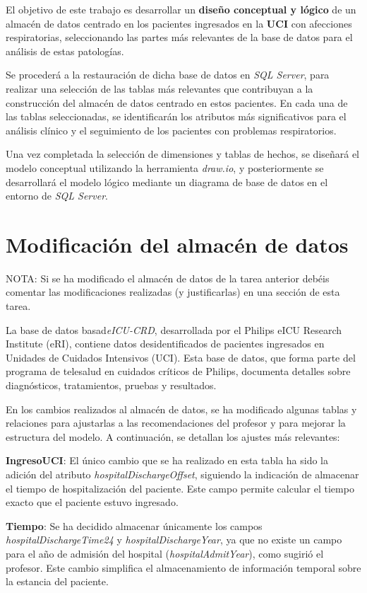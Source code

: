 \documentclass[12pt, a4paper, twoside]{article}
\begin{document}
	El objetivo de este trabajo es desarrollar un \textbf{diseño conceptual y lógico} de un almacén de datos centrado en los pacientes ingresados en la \textbf{UCI} con afecciones respiratorias, seleccionando las partes más relevantes de la base de datos para el análisis de estas patologías.
	
	Se procederá a la restauración de dicha base de datos en \textit{SQL Server}, para realizar una selección de las tablas más relevantes que contribuyan a la construcción del almacén de datos centrado en estos pacientes. En cada una de las tablas seleccionadas, se identificarán los atributos más significativos para el análisis clínico y el seguimiento de los pacientes con problemas respiratorios. 
	
	Una vez completada la selección de dimensiones y tablas de hechos, se diseñará el modelo conceptual utilizando la herramienta \textit{draw.io}, y posteriormente se desarrollará el modelo lógico mediante un diagrama de base de datos en el entorno de \textit{SQL Server}. 
	
	\section{Modificación del almacén de datos}
	
	NOTA: Si se ha modificado el almacén de datos de la tarea anterior debéis comentar las modificaciones realizadas (y justificarlas) en una sección de esta tarea. 
	
	 La base de datos basad\textit{eICU-CRD}, desarrollada por el Philips eICU Research Institute (eRI), contiene datos desidentificados de pacientes ingresados en Unidades de Cuidados Intensivos (UCI). Esta base de datos, que forma parte del programa de telesalud en cuidados críticos de Philips, documenta detalles sobre diagnósticos, tratamientos, pruebas y resultados.
	
	En los cambios realizados al almacén de datos, se ha modificado algunas tablas y relaciones para ajustarlas a las recomendaciones del profesor y para mejorar la estructura del modelo. A continuación, se detallan los ajustes más relevantes:
	
	\textbf{IngresoUCI}: El único cambio que se ha realizado en esta tabla ha sido la adición del atributo \textit{hospitalDischargeOffset}, siguiendo la indicación de almacenar el tiempo de hospitalización del paciente. Este campo permite calcular el tiempo exacto que el paciente estuvo ingresado.
	
	\textbf{Tiempo}: Se ha decidido almacenar únicamente los campos \textit{hospitalDischargeTime24} y \textit{hospitalDischargeYear}, ya que no existe un campo para el año de admisión del hospital (\textit{hospitalAdmitYear}), como sugirió el profesor. Este cambio simplifica el almacenamiento de información temporal sobre la estancia del paciente.
	
\end{document}
